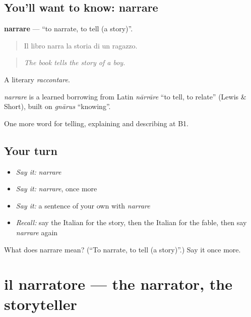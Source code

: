 \subsection*{You'll want to know: narrare}
\textbf{narrare} — \textquotedblleft{}to narrate, to tell (a story)\textquotedblright{}.

\begin{quote}
Il libro narra la storia di un ragazzo.
\end{quote}

\begin{quote}
\emph{The book tells the story of a boy.}
\end{quote}

A literary \emph{raccontare}.

\begin{cousinweb}
\emph{narrare} is a learned borrowing from Latin \emph{nārrāre} \textquotedblleft{}to tell, to relate\textquotedblright{} (Lewis \& Short), built on \emph{gnārus} \textquotedblleft{}knowing\textquotedblright{}.
\end{cousinweb}

\begin{grammarlens}[title={What you've built}]
One more word for telling, explaining and describing at B1.
\end{grammarlens}

\subsection*{Your turn}
\begin{itemize}
\raggedright
  \item \emph{Say it:} \emph{narrare}
  \item \emph{Say it:} \emph{narrare}, once more
  \item \emph{Say it:} a sentence of your own with \emph{narrare}
  \item \emph{Recall:} say the Italian for the story, then the Italian for the fable, then say \emph{narrare} again
\end{itemize}

\begin{tcolorbox}[breakable,colback=teal!4,colframe=teal!35!black,title={Before you move on}]
What does narrare mean? (\textquotedblleft{}To narrate, to tell (a story)\textquotedblright{}.) Say it once more.
\end{tcolorbox}
\section[il narratore]{il narratore — the narrator, the storyteller}

